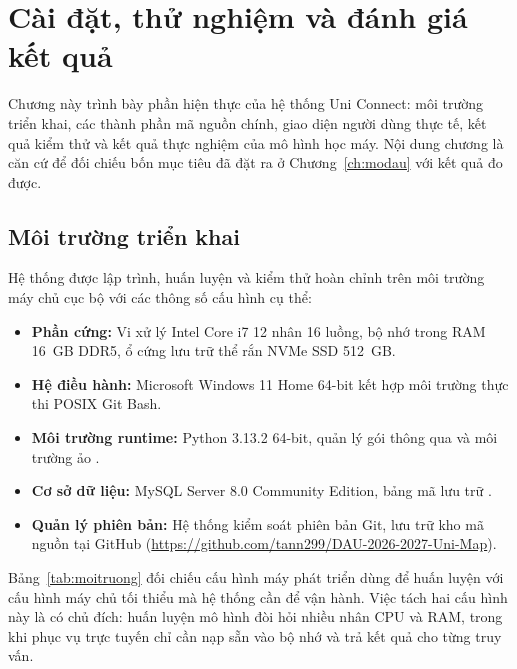 \chapter{Cài đặt, thử nghiệm và đánh giá kết quả}
\label{ch:caidat}
\label{ch:ketqua}

Chương này trình bày phần hiện thực của hệ thống Uni Connect: môi trường triển khai,
các thành phần mã nguồn chính, giao diện người dùng thực tế, kết quả kiểm thử và kết
quả thực nghiệm của mô hình học máy. Nội dung chương là căn cứ để đối chiếu bốn mục
tiêu đã đặt ra ở Chương~\ref{ch:modau} với kết quả đo được.

\section{Môi trường triển khai}

Hệ thống được lập trình, huấn luyện và kiểm thử hoàn chỉnh trên môi trường máy chủ
cục bộ với các thông số cấu hình cụ thể:
\begin{itemize}[leftmargin=1.6em, itemsep=2pt]
  \item \textbf{Phần cứng:} Vi xử lý Intel Core i7 12 nhân 16 luồng, bộ nhớ trong RAM 16~GB DDR5, ổ cứng lưu trữ thể rắn NVMe SSD 512~GB.
  \item \textbf{Hệ điều hành:} Microsoft Windows 11 Home 64-bit kết hợp môi trường thực thi POSIX Git Bash.
  \item \textbf{Môi trường runtime:} Python 3.13.2 64-bit, quản lý gói thông qua  và môi trường ảo .
  \item \textbf{Cơ sở dữ liệu:} MySQL Server 8.0 Community Edition, bảng mã lưu trữ .
  \item \textbf{Quản lý phiên bản:} Hệ thống kiểm soát phiên bản Git, lưu trữ kho mã nguồn tại GitHub (\url{https://github.com/tann299/DAU-2026-2027-Uni-Map}).
\end{itemize}

Bảng~\ref{tab:moitruong} đối chiếu cấu hình máy phát triển dùng để huấn luyện với cấu
hình máy chủ tối thiểu mà hệ thống cần để vận hành. Việc tách hai cấu hình này là có
chủ đích: huấn luyện mô hình đòi hỏi nhiều nhân CPU và RAM, trong khi phục vụ trực
tuyến chỉ cần nạp sẵn  vào bộ nhớ và trả kết quả cho từng truy vấn.

